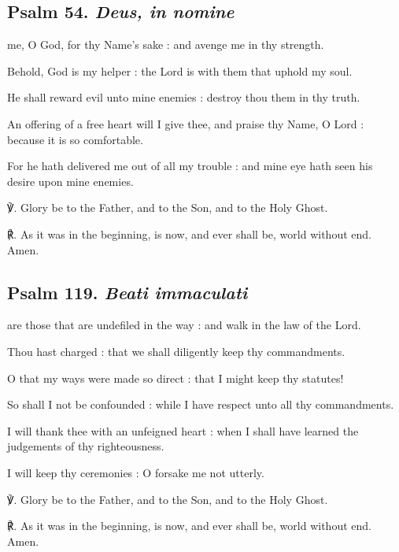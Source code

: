 \begin{multicols}{2}
\subsection{Psalm 54. \textit{Deus, in nomine}}
 me, O God, for thy Name's sake : and avenge me in thy strength.\par
{}
Behold, God is my helper : the Lord is with them that uphold my soul.\par
{}He shall reward evil unto mine enemies : destroy thou them in thy truth.\par
{}An offering of a free heart will I give thee, and praise thy Name, O Lord : because it is so comfortable.\par
{}For he hath delivered me out of all my trouble : and mine eye hath seen his desire upon mine enemies.\par
℣. Glory be to the Father, and to the Son, and to the Holy Ghost.\par
℟. As it was in the beginning, is now, and ever shall be, world without end. Amen.

\subsection{Psalm 119. \textit{Beati immaculati}}
 are those that are undefiled in the way : and walk in the law of the Lord.\par
{}
Thou hast charged : that we shall diligently keep thy commandments.\par
{}O that my ways were made so direct : that I might keep thy statutes!\par
{}So shall I not be confounded : while I have respect unto all thy commandments.\par
{}I will thank thee with an unfeigned heart : when I shall have learned the judgements of thy righteousness.\par
{}I will keep thy ceremonies : O forsake me not utterly.\par
℣. Glory be to the Father, and to the Son, and to the Holy Ghost.\par
℟. As it was in the beginning, is now, and ever shall be, world without end. Amen.


\end{multicols}
